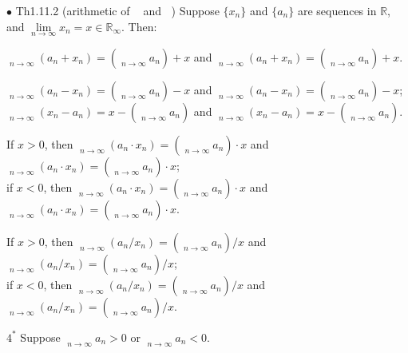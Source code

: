 \documentclass{article}
\begin{document}
\begin{Th}{$\bullet$ Th1.11.2 (arithmetic of $\mathop{\overline{\lim}}$ and $\mathop{\underline{\lim}}$)}
    Suppose $\{x_n\}$ and $\{a_n\}$ are sequences in $\mathbb{R}$, and $\lim\limits_{n\to\infty}x_n = x\in\mathbb{R}_\infty$. Then:
    \begin{compactenum}
        \item $\mathop{\overline{\lim}}\limits_{n\to\infty}(a_n + x_n) = \left(\mathop{\overline{\lim}}\limits_{n\to\infty}a_n\right) + x$ and $\mathop{\underline{\lim}}\limits_{n\to\infty}(a_n + x_n) = \left(\mathop{\underline{\lim}}\limits_{n\to\infty}a_n\right) + x$.
        \item $\mathop{\overline{\lim}}\limits_{n\to\infty}(a_n - x_n) = \left(\mathop{\overline{\lim}}\limits_{n\to\infty}a_n\right) - x$ and $\mathop{\underline{\lim}}\limits_{n\to\infty}(a_n - x_n) = \left(\mathop{\underline{\lim}}\limits_{n\to\infty}a_n\right) - x$; \\
        $\mathop{\overline{\lim}}\limits_{n\to\infty}(x_n - a_n) = x - \left(\mathop{\underline{\lim}}\limits_{n\to\infty}a_n\right)$ and $\mathop{\underline{\lim}}\limits_{n\to\infty}(x_n - a_n) = x - \left(\mathop{\overline{\lim}}\limits_{n\to\infty}a_n\right)$.
        \item If $x>0$, then $\mathop{\overline{\lim}}\limits_{n\to\infty}(a_n\cdot x_n) = \left(\mathop{\overline{\lim}}\limits_{n\to\infty}a_n\right)\cdot x$ and $\mathop{\underline{\lim}}\limits_{n\to\infty}(a_n\cdot x_n) = \left(\mathop{\underline{\lim}}\limits_{n\to\infty}a_n\right)\cdot x$; \\ 
        if $x<0$, then $\mathop{\overline{\lim}}\limits_{n\to\infty}(a_n\cdot x_n) = \left(\mathop{\underline{\lim}}\limits_{n\to\infty}a_n\right)\cdot x$ and $\mathop{\underline{\lim}}\limits_{n\to\infty}(a_n\cdot x_n) = \left(\mathop{\overline{\lim}}\limits_{n\to\infty}a_n\right)\cdot x$.
        \item If $x>0$, then $\mathop{\overline{\lim}}\limits_{n\to\infty}(a_n/x_n) = \left(\mathop{\overline{\lim}}\limits_{n\to\infty}a_n\right)/x$ and $\mathop{\underline{\lim}}\limits_{n\to\infty}(a_n/x_n) = \left(\mathop{\underline{\lim}}\limits_{n\to\infty}a_n\right)/x$;\\ 
        if $x<0$, then $\mathop{\overline{\lim}}\limits_{n\to\infty}(a_n/x_n) = \left(\mathop{\underline{\lim}}\limits_{n\to\infty}a_n\right)/x$ and $\mathop{\underline{\lim}}\limits_{n\to\infty}(a_n/x_n) = \left(\mathop{\overline{\lim}}\limits_{n\to\infty}a_n\right)/x$. 
        \item[$4^*$] Suppose $\mathop{\underline{\lim}}\limits_{n\to\infty}a_n>0$ or $\mathop{\overline{\lim}}\limits_{n\to\infty}a_n<0$. \\

\end{compactenum}
\end{Th}
\end{document}
